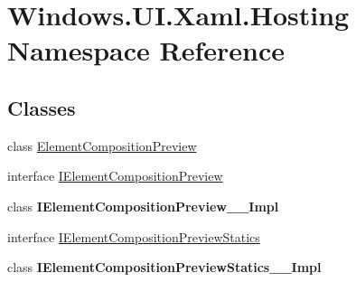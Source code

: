\hypertarget{namespace_windows_1_1_u_i_1_1_xaml_1_1_hosting}{}\section{Windows.\+U\+I.\+Xaml.\+Hosting Namespace Reference}
\label{namespace_windows_1_1_u_i_1_1_xaml_1_1_hosting}
\subsection*{Classes}
\begin{DoxyCompactItemize}
\item 
class \hyperlink{class_windows_1_1_u_i_1_1_xaml_1_1_hosting_1_1_element_composition_preview}{Element\+Composition\+Preview}
\item 
interface \hyperlink{interface_windows_1_1_u_i_1_1_xaml_1_1_hosting_1_1_i_element_composition_preview}{I\+Element\+Composition\+Preview}
\item 
class {\bfseries I\+Element\+Composition\+Preview\+\_\+\+\_\+\+Impl}
\item 
interface \hyperlink{interface_windows_1_1_u_i_1_1_xaml_1_1_hosting_1_1_i_element_composition_preview_statics}{I\+Element\+Composition\+Preview\+Statics}
\item 
class {\bfseries I\+Element\+Composition\+Preview\+Statics\+\_\+\+\_\+\+Impl}
\end{DoxyCompactItemize}

